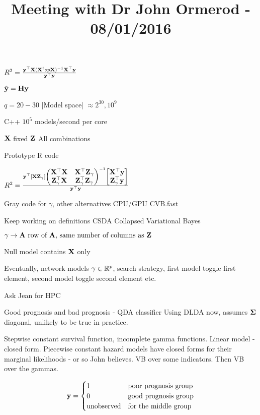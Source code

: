 \documentclass{amsart}
\title{Meeting with Dr John Ormerod - 08/01/2016}
\begin{document}
\maketitle

$R^2 = \frac{{\bf y}^\top {\bf X} ({\bf X}^top {\bf X})^{-1} {\bf X}^\top {\bf y}}{{\bf y}^\top {\bf y}}$

$\hat{{\bf y}} = {\bf H} {\bf y}$

$q = 20 - 30$
|Model space| $\approx 2^30, 10^9$

C++ $10^5$ models/second per core

${\bf X}$ fixed
${\bf Z}$ All combinations

Prototype R code

$R^2 = \frac{{\bf y}^\top [{\bf X} {\bf Z}_\gamma]
\begin{pmatrix}
{\bf X}^\top {\bf X} & {\bf X}^\top {\bf Z}_\gamma \\
{\bf Z}_\gamma ^\top {\bf X} & {\bf Z}_\gamma^\top {\bf Z}_\gamma
\end{pmatrix}^{-1}
\begin{bmatrix}
{\bf X}^\top {\bf y} \\
{\bf Z}_\gamma^\top {\bf y}
\end{bmatrix}}{{\bf y}^\top {\bf y}}
$

Gray code for $\gamma$, other alternatives
CPU/GPU
CVB.fast

Keep working on definitions
CSDA
Collapsed Variational Bayes

$\gamma \to {\bf A} \text{ row of ${\bf A}$, same number of columns as ${\bf Z}$}$

Null model contains ${\bf X}$ only

Eventually, network models
$\gamma \in {\mathbb R}^p$, search strategy, first model toggle first element, second model toggle second element etc.

Ask Jean for HPC

Good prognosis and bad prognosis - QDA classifier
Using DLDA now, assumes ${\boldsymbol \Sigma}$ diagonal, unlikely to be true in practice.


Stepwise constant survival function, incomplete gamma functions.
Linear model - closed form.
Piecewise constant hazard models have closed forms for their marginal likelihoods - or so John believes.
VB over some indicators.
Then VB over the gammas.

$$
{\bf y} =
\begin{cases}
1 & \text{poor prognosis group} \\
0 & \text{good prognosis group} \\
\text{unobserved} & \text{for the middle group}
\end{cases}
$$
\end{document}

